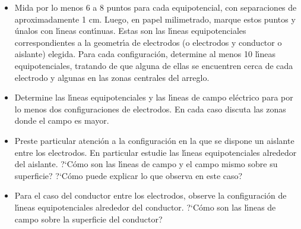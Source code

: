 \documentclass[laboratorio]{guia}
\begin{document}
\begin{itemize}
    \item Mida por lo menos 6 a 8 puntos para cada equipotencial, con
        separaciones de aproximadamente 1 cm. Luego, en papel milimetrado,
        marque estos puntos y \'unalos con l\'\i neas cont\'\i nuas. Estas son
        las l\'\i neas equipotenciales correspondientes a la geometr\'\i a de
        electrodos (o electrodos y conductor o aislante) elegida. Para cada
        configuraci\'on, determine al menos 10 l\'\i neas equipotenciales,
        tratando de que alguna de ellas se encuentren cerca de cada electrodo y
        algunas en las zonas centrales del arreglo.

    \item Determine las l\'\i neas equipotenciales y las l\'\i neas de campo
        el\'ectrico para por lo menos dos configuraciones de electrodos. En
        cada caso discuta las zonas donde el campo es mayor.

    \item Preste particular atenci\'on a la configuraci\'on en la que se
        dispone un aislante entre los electrodos. En particular estudie las
        l\'\i neas equipotenciales alrededor del aislante. ?`C\'omo son las
        l\'\i neas de campo y el campo mismo sobre su superficie? ?`C\'omo
        puede explicar lo que observa en este caso?

    \item Para el caso del conductor entre los electrodos, observe la
        configuraci\'on de l\'\i neas equipotenciales alrededor del conductor.
        ?`C\'omo son las l\'\i neas de campo sobre la superficie del conductor?
\end{itemize}


\nocite{Alonso1998,Purcell1988,Reitz1996,Trelles1984}
 

\end{document}
